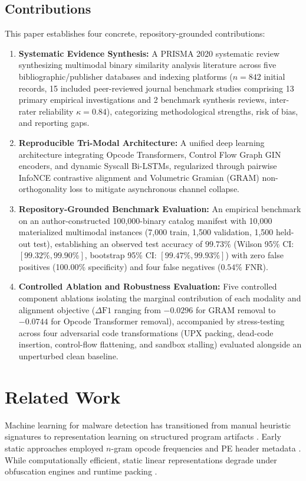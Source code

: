 \documentclass[pdflatex,sn-mathphys-num]{sn-jnl}
\begin{document}
\subsection{Contributions}\label{sec:intro_contributions}
This paper establishes four concrete, repository-grounded contributions:
\begin{enumerate}
    \item \textbf{Systematic Evidence Synthesis:} A PRISMA 2020 systematic review synthesizing multimodal binary similarity analysis literature across five bibliographic/publisher databases and indexing platforms ($n = 842$ initial records, 15 included peer-reviewed journal benchmark studies comprising 13 primary empirical investigations and 2 benchmark synthesis reviews, inter-rater reliability $\kappa = 0.84$), categorizing methodological strengths, risk of bias, and reporting gaps.
    \item \textbf{Reproducible Tri-Modal Architecture:} A unified deep learning architecture integrating Opcode Transformers, Control Flow Graph GIN encoders, and dynamic Syscall Bi-LSTMs, regularized through pairwise InfoNCE contrastive alignment and Volumetric Gramian (GRAM) non-orthogonality loss to mitigate asynchronous channel collapse.
    \item \textbf{Repository-Grounded Benchmark Evaluation:} An empirical benchmark on an author-constructed 100,000-binary catalog manifest with 10,000 materialized multimodal instances (7,000 train, 1,500 validation, 1,500 held-out test), establishing an observed test accuracy of $99.73\%$ (Wilson 95\% CI: $[99.32\%, 99.90\%]$, bootstrap 95\% CI: $[99.47\%, 99.93\%]$) with zero false positives (100.00\% specificity) and four false negatives ($0.54\%$ FNR).
    \item \textbf{Controlled Ablation and Robustness Evaluation:} Five controlled component ablations isolating the marginal contribution of each modality and alignment objective ($\Delta\text{F1}$ ranging from $-0.0296$ for GRAM removal to $-0.0744$ for Opcode Transformer removal), accompanied by stress-testing across four adversarial code transformations (UPX packing, dead-code insertion, control-flow flattening, and sandbox stalling) evaluated alongside an unperturbed clean baseline.
\end{enumerate}

\section{Related Work}\label{sec:related_work}
Machine learning for malware detection has transitioned from manual heuristic signatures to representation learning on structured program artifacts \cite{Gibert2020,Shaukat2020}. Early static approaches employed $n$-gram opcode frequencies and PE header metadata \cite{Ni2018,Kim2023Revisiting}. While computationally efficient, static linear representations degrade under obfuscation engines and runtime packing \cite{Borello2014,Fernando2022}.
\end{document}
